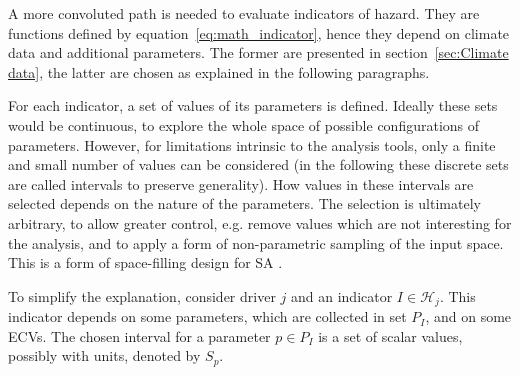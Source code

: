 A more convoluted path is needed to evaluate \glspl{indicator} of \gls{hazard}. They are functions defined by equation~\eqref{eq:math_indicator}, hence they depend on climate data and additional parameters. The former are presented in section~\ref{sec:Climate data}, the latter are chosen as explained in the following paragraphs.

For each \gls{indicator}, a set of values of its parameters is defined. Ideally these sets would be continuous, to explore the whole space of possible configurations of parameters. However, for limitations intrinsic to the analysis tools, only a finite and small number of values can be considered (in the following these discrete sets are called intervals to preserve generality).
How values in these intervals are selected depends on the nature of the parameters. The selection is ultimately arbitrary, to allow greater control, e.g. remove values which are not interesting for the analysis, and to apply a form of non-parametric sampling of the input space. This is a form of space-filling design for \gls{SA} \cite[593-594]{2015DeanHandbookOf}.

To simplify the explanation, consider \gls{driver} $j$ and an \gls{indicator} $I \in \mathcal{H}_j$. This \gls{indicator} depends on some parameters, which are collected in set $P_I$, and on some \glspl{ECV}. The chosen interval for a parameter $p \in P_I$ is a set of scalar values, possibly with units, denoted by $S_p$.

